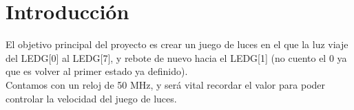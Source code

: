 \documentclass{article}
\begin{document}
\begin{center}
    

\end{center}
\begin{center}
    

\end{center}
\begin{center}
    

\end{center}

\newpage

\tableofcontents

\newpage

\section{Introducción}
\begin{flushleft}
    
El objetivo principal del proyecto es crear un juego de luces en el que la luz viaje del LEDG[0]
al LEDG[7], y rebote de nuevo hacia el LEDG[1] (no cuento el 0 ya que es volver al primer estado ya definido). \\

Contamos con un reloj de 50 MHz, y será vital recordar el valor para poder controlar la velocidad del juego de luces.

\end{flushleft}

\end{document}
